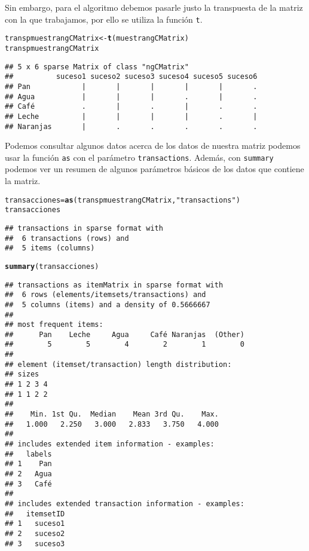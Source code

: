 \documentclass[12pt]{report}\usepackage[]{graphicx}\usepackage[dvipsnames]{xcolor}
\makeatletter
\newcommand{\hlstr}[1]{\textcolor[rgb]{0.192,0.494,0.8}{#1}}%
\newcommand{\hlstd}[1]{\textcolor[rgb]{0.345,0.345,0.345}{#1}}%
\newcommand{\hlkwb}[1]{\textcolor[rgb]{0.69,0.353,0.396}{#1}}%
\newcommand{\hlkwd}[1]{\textcolor[rgb]{0.737,0.353,0.396}{\textbf{#1}}}%
\newenvironment{kframe}{%
 \def\at@end@of@kframe{}%
 \ifinner\ifhmode%
  \def\at@end@of@kframe{\end{minipage}}%
  \begin{minipage}{\columnwidth}%
 \fi\fi%
 \def\FrameCommand##1{\hskip\@totalleftmargin \hskip-\fboxsep
 \colorbox{shadecolor}{##1}\hskip-\fboxsep
     \hskip-\linewidth \hskip-\@totalleftmargin \hskip\columnwidth}%
 \MakeFramed {\advance\hsize-\width
   \@totalleftmargin\z@ \linewidth\hsize
   \@setminipage}}%
 {\par\unskip\endMakeFramed%
 \at@end@of@kframe}
\newenvironment{knitrout}{}{} %
\makeatother
\begin{document}
			Sin embargo, para el algoritmo debemos pasarle justo la transpuesta de la matriz con la que trabajamos, por ello se utiliza la función \texttt{t}. 
			
\begin{knitrout}
\color{fgcolor}\begin{kframe}
\begin{alltt}
\hlstd{transpmuestrangCMatrix} \hlkwb{<-} \hlkwd{t}\hlstd{(muestrangCMatrix)}
\hlstd{transpmuestrangCMatrix}
\end{alltt}
\begin{verbatim}
## 5 x 6 sparse Matrix of class "ngCMatrix"
##          suceso1 suceso2 suceso3 suceso4 suceso5 suceso6
## Pan            |       |       |       |       |       .
## Agua           |       |       |       .       |       .
## Café           .       |       .       |       .       .
## Leche          |       |       |       |       .       |
## Naranjas       |       .       .       .       .       .
\end{verbatim}
\end{kframe}
\end{knitrout}
			
			Podemos consultar algunos datos acerca de los datos de nuestra matriz podemos usar la función \texttt{as} con el parámetro \texttt{transactions}. Además, con \texttt{summary} podemos ver un resumen de algunos parámetros básicos de los datos que contiene la matriz. 
			
\begin{knitrout}
\color{fgcolor}\begin{kframe}
\begin{alltt}
\hlstd{transacciones} \hlkwb{=} \hlkwd{as}\hlstd{(transpmuestrangCMatrix,} \hlstr{"transactions"}\hlstd{)}
\hlstd{transacciones}
\end{alltt}
\begin{verbatim}
## transactions in sparse format with
##  6 transactions (rows) and
##  5 items (columns)
\end{verbatim}
\begin{alltt}
\hlkwd{summary}\hlstd{(transacciones)}
\end{alltt}
\begin{verbatim}
## transactions as itemMatrix in sparse format with
##  6 rows (elements/itemsets/transactions) and
##  5 columns (items) and a density of 0.5666667 
## 
## most frequent items:
##      Pan    Leche     Agua     Café Naranjas  (Other) 
##        5        5        4        2        1        0 
## 
## element (itemset/transaction) length distribution:
## sizes
## 1 2 3 4 
## 1 1 2 2 
## 
##    Min. 1st Qu.  Median    Mean 3rd Qu.    Max. 
##   1.000   2.250   3.000   2.833   3.750   4.000 
## 
## includes extended item information - examples:
##   labels
## 1    Pan
## 2   Agua
## 3   Café
## 
## includes extended transaction information - examples:
##   itemsetID
## 1   suceso1
## 2   suceso2
## 3   suceso3
\end{verbatim}
\end{kframe}
\end{knitrout}
			
\end{document}

